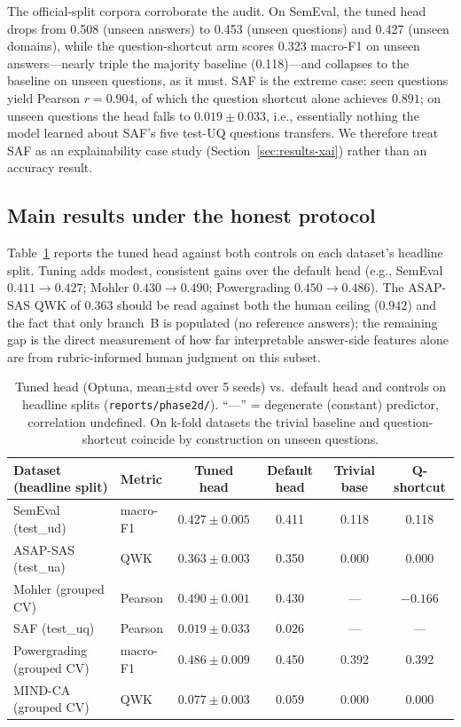 \documentclass[11pt]{article}
\begin{document}
The official-split corpora corroborate the audit. On SemEval, the tuned head
drops from 0.508 (unseen answers) to 0.453 (unseen questions) and 0.427
(unseen domains), while the question-shortcut arm scores 0.323 macro-F1 on
unseen answers---nearly triple the majority baseline (0.118)---and collapses to
the baseline on unseen questions, as it must. SAF is the extreme case: seen
questions yield Pearson $r{=}0.904$, of which the question shortcut alone
achieves $0.891$; on unseen questions the head falls to $0.019\pm0.033$,
i.e., essentially nothing the model learned about SAF's five test-UQ questions
transfers. We therefore treat SAF as an explainability case study
(Section~\ref{sec:results-xai}) rather than an accuracy result.

\subsection{Main results under the honest protocol}
\label{sec:results-main}

Table~\ref{tab:main} reports the tuned head against both controls on each
dataset's headline split. Tuning adds modest, consistent gains over the
default head (e.g., SemEval $0.411\!\rightarrow\!0.427$; Mohler
$0.430\!\rightarrow\!0.490$; Powergrading $0.450\!\rightarrow\!0.486$). The
ASAP-SAS QWK of $0.363$ should be read against both the human ceiling
($0.942$) and the fact that only branch~B is populated (no reference answers);
the remaining gap is the direct measurement of how far interpretable
answer-side features alone are from rubric-informed human judgment on this
subset.

\begin{table}[t]
\centering\small
\begin{tabular}{llcccc}
\toprule
Dataset (headline split) & Metric & Tuned head & Default head & Trivial base & Q-shortcut \\
\midrule
SemEval (test\_ud)  & macro-F1 & $0.427\pm0.005$ & 0.411 & 0.118 & 0.118 \\
ASAP-SAS (test\_ua) & QWK      & $0.363\pm0.003$ & 0.350 & 0.000 & 0.000 \\
Mohler (grouped CV) & Pearson  & $0.490\pm0.001$ & 0.430 & --- & $-0.166$ \\
SAF (test\_uq)      & Pearson  & $0.019\pm0.033$ & 0.026 & --- & --- \\
Powergrading (grouped CV) & macro-F1 & $0.486\pm0.009$ & 0.450 & 0.392 & 0.392 \\
MIND-CA (grouped CV) & QWK     & $0.077\pm0.003$ & 0.059 & 0.000 & 0.000 \\
\bottomrule
\end{tabular}
\caption{Tuned head (Optuna, mean$\pm$std over 5 seeds) vs.\ default head and
controls on headline splits (\texttt{reports/phase2d/}). ``---'' = degenerate
(constant) predictor, correlation undefined. On k-fold datasets the trivial
baseline and question-shortcut coincide by construction on unseen questions.}
\label{tab:main}
\end{table}
\end{document}
